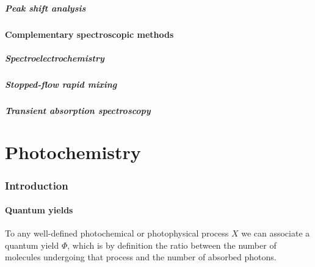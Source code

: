 \documentclass{article}
\numberwithin{theorem}{section}
\numberwithin{corollary}{section}
\numberwithin{postulate}{section}
\numberwithin{lemma}{section}
\numberwithin{definition}{section}
\begin{document}
\subsubsection{Peak shift analysis}

\subsection{Complementary spectroscopic methods}

\subsubsection{Spectroelectrochemistry}

\subsubsection{Stopped-flow rapid mixing}

\subsubsection{Transient absorption spectroscopy}

\part{Photochemistry}

\section{Introduction}

\subsection{Quantum yields}
To any well-defined photochemical or photophysical process $X$ we can associate
a quantum yield $\Phi$, which is by definition the ratio between the number of
molecules undergoing that process and the number of absorbed photons.
\end{document}
